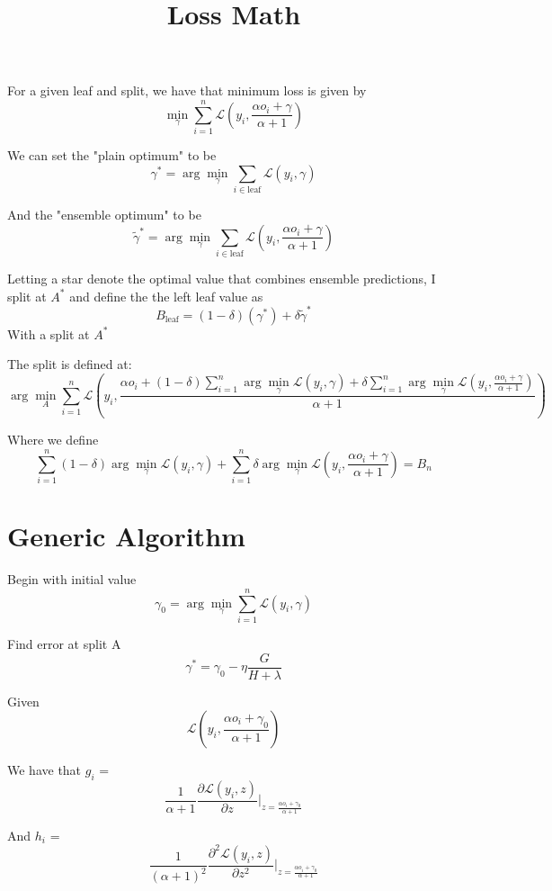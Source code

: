 \documentclass{article}
\begin{document}
\title{Loss Math}
\author{}
\date{}

\maketitle

For a given leaf and split, we have that minimum loss is given by \[
\min_{\gamma} \sum_{i=1}^{n} \mathcal{L}(y_i, \frac{\alpha o_i + \gamma}{\alpha + 1})
\]

We can set the "plain optimum" to be \[
\gamma^* = \arg \min_\gamma \sum_{i \in \text{leaf}} \mathcal{L}(y_i, \gamma)
\]

And the "ensemble optimum" to be \[
\tilde{\gamma}^* = \arg \min_\gamma \sum_{i \in \text{leaf}} \mathcal{L}(y_i, \frac{\alpha o_i + \gamma}{\alpha + 1})
\]

Letting a star denote the optimal value that combines ensemble predictions, I split at $A^*$ and define the 
the left leaf value as 
\[
B_{\text{leaf}} = (1 - \delta)(\gamma^*) + \delta \tilde{\gamma}^*
\]
With a split at $A^*$

The split is defined at:
\[
\arg\min_A \sum_{i=1}^n \mathcal{L}(y_i, \frac{\alpha o_i + (1 - \delta)\sum_{i=1}^n \arg\min_{\gamma} \mathcal{L}(y_i, \gamma) + \delta \sum_{i=1}^n \arg\min_\gamma \mathcal{L}(y_i, \frac{\alpha o_i + \gamma}{\alpha + 1})}{\alpha + 1})
\]

Where we define \[
    \sum_{i=1}^n (1 - \delta)\arg\min_{\gamma} \mathcal{L}(y_i, \gamma) + \sum_{i=1}^n \delta \arg\min_\gamma \mathcal{L}(y_i, \frac{\alpha o_i + \gamma}{\alpha + 1}) = B_n
\]

\section*{Generic Algorithm}
Begin with initial value \[
    \gamma_0 = \arg\min_{\gamma} \sum_{i=1}^n \mathcal{L}(y_i, \gamma)
\]

Find error at split A \[
\gamma^* = \gamma_0 - \eta \frac{G}{H + \lambda}
\]

Given \[
\mathcal{L}(y_i, \frac{\alpha o_i + \gamma_0}{\alpha + 1})
\]

We have that $g_i$ = \[
\frac{1}{\alpha + 1} \frac{\partial \mathcal{L}(y_i, z)}{\partial z}\big|_{z = \frac{\alpha o_i + \gamma_0}{\alpha + 1}}
\]

And $h_i$ = \[
\frac{1}{(\alpha + 1)^2} \frac{\partial^2 \mathcal{L}(y_i, z)}{\partial z^2}\big|_{z = \frac{\alpha o_i + \gamma_0}{\alpha + 1}}
\]
\end{document}

